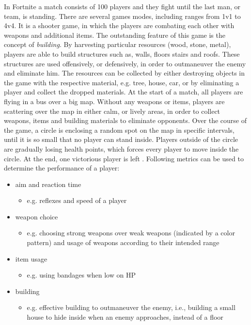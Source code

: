 In Fortnite a match consists of 100 players and they fight until the last man, or team, is standing. There are several games modes, including ranges from 1v1 to 4v4. It is a shooter game, in which the players are combating each other with weapons and additional items. The outstanding feature of this game is the concept of \textit{building}. By harvesting particular resources (wood, stone, metal), players are able to build structures such as, walls, floors stairs and roofs. These structures are used offensively, or defensively, in order to outmaneuver the enemy and eliminate him. The resources can be collected by either destroying objects in the game with the respective material, e.g. tree, house, car, or by eliminating a player and collect the dropped materials. At the start of a match, all players are flying in a bus over a big map. Without any weapons or items, players are scattering over the map in either calm, or lively areas, in order to collect weapons, items and building materials to eliminate opponents. Over the course of the game, a circle is enclosing a random spot on the map in specific intervals, until it is so small that no player can stand inside. Players outside of the circle are gradually losing health points, which forces every player to move inside the circle. At the end, one victorious player is left \cite{BattleRo48:online}. Following metrics can be used to determine the performance of a player:
\begin{itemize}
	\item aim and reaction time
		\begin{itemize}
			\item e.g. reflexes and speed of a player
		\end{itemize}
	\item weapon choice
		\begin{itemize}
			\item e.g. choosing strong weapons over weak weapons (indicated by a color pattern) and usage of weapons according to their intended range
		\end{itemize}
	\item item usage
		\begin{itemize}
			\item e.g. using bandages when low on HP
		\end{itemize}
	\item building
		\begin{itemize}
			\item e.g. effective building to outmaneuver the enemy, i.e., building a small house to hide inside when an enemy approaches, instead of a floor \cite{GuideBat52:online}
		\end{itemize}
\end{itemize}

